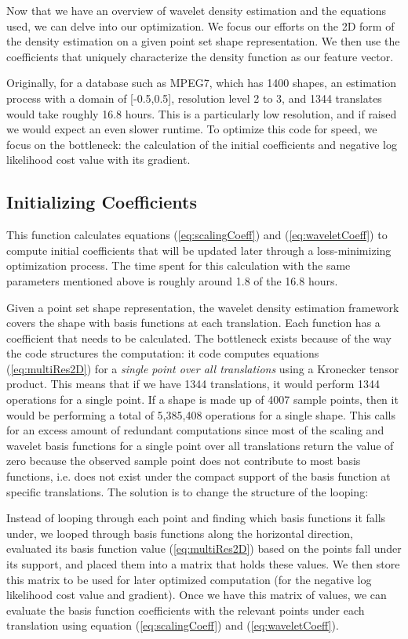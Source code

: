 \documentclass[../tech_report_1.tex]{subfiles}
\begin{document}
Now that we have an overview of wavelet density estimation and the
equations used, we can delve into our optimization. We focus our efforts on the 2D form of the density estimation on a given point set shape representation.
We then use the coefficients that uniquely characterize the density
function as our feature vector. 

Originally, for a database such as
MPEG7, which has 1400 shapes, an estimation process with a domain of {[}-0.5,0.5{]}, resolution
level 2 to 3, and 1344 translates would take roughly 16.8 hours.
This is a particularly low resolution, and if raised we would expect
an even slower runtime. To optimize this code for speed, we focus on the
bottleneck: the calculation of the initial coefficients and negative
log likelihood cost value with its gradient. 


\subsection*{Initializing Coefficients}

This function calculates equations (\ref{eq:scalingCoeff})
and (\ref{eq:waveletCoeff}) to compute initial coefficients
that will be updated later through a loss-minimizing optimization process.
The time spent for this calculation with the same parameters mentioned
above is roughly around 1.8 of the 16.8 hours. 

Given a point set shape representation, the wavelet density estimation framework covers the
shape with basis functions at each translation. Each function has
a coefficient that needs to be calculated. The bottleneck exists because of the way the code structures the computation: it
code computes equations (\ref{eq:multiRes2D}) for a \emph{single
point over all translations} using a Kronecker
tensor product. \cite{van2000ubiquitous}
 This means that if we have 1344 translations,
it would perform 1344 operations for a single point. If a shape is made up of 4007 sample
points, then it would be performing a total of 5,385,408 operations
for a single shape. This calls for an excess amount of redundant computations
since most of the scaling and wavelet basis functions for a single
point over all translations return the value of zero because the observed sample point does not contribute
to most basis functions, i.e. does not exist under the compact support
of the basis function at specific translations. The solution is to change the structure of the looping: 

Instead of looping through each point and finding which basis functions
it falls under, we looped through basis functions along the horizontal
direction, evaluated its basis function value (\ref{eq:multiRes2D})
based on the points fall under its support, and placed them into a
matrix that holds these values. We then store this matrix to be used
for later optimized computation (for the negative log likelihood cost
value and gradient). Once we have this matrix of values, we can evaluate the basis function coefficients with the relevant points
under each translation using equation (\ref{eq:scalingCoeff}) and
(\ref{eq:waveletCoeff}). 
\end{document}
